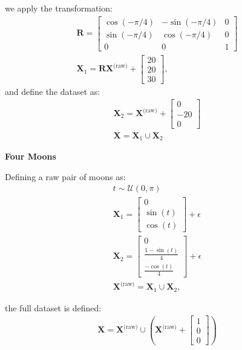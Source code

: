 \documentclass{article} %
\begin{document}
we apply the transformation:
\begin{align}
\mathbf{R} = \begin{bmatrix}
\cos(-\pi/4) & -\sin(-\pi/4) & 0 \\
\sin(-\pi/4) & \cos(-\pi/4) & 0 \\
0 & 0 & 1
\end{bmatrix} \\
\mathbf{X}_1 = \mathbf{R} \mathbf{X}^{\text{(raw)}} + \begin{bmatrix} 20 \\ 20 \\ 30 \end{bmatrix},
\end{align}
and define the dataset as:
\begin{align}
    \mathbf{X}_2 = \mathbf{X}^{\text{(raw)}} + \begin{bmatrix} 0 \\ -20 \\ 0 \end{bmatrix} \\
    \mathbf{X} = \mathbf{X}_1 \cup \mathbf{X}_2
\end{align}

\textbf{Four Moons}

Defining a raw pair of moons as:
\begin{align}
    t \sim \mathcal{U}(0, \pi) \\
\mathbf{X}_1 = \begin{bmatrix}
0 \\
\sin(t) \\
\cos(t)
\end{bmatrix} + \epsilon\\
\mathbf{X}_2 = \begin{bmatrix}
0 \\
\frac{1-\sin(t)}{4} \\
\frac{-\cos(t)}{4}
\end{bmatrix} + \epsilon\\
    \mathbf{X}^{\text{(raw)}} = \mathbf{X}_1 \cup \mathbf{X}_2,
\end{align}

the full dataset is defined:
\begin{align}
    \mathbf{X} = \mathbf{X}^{\text{(raw)}} \cup \left( \mathbf{X}^{\text{(raw)}} + \begin{bmatrix} 1 \\ 0 \\ 0 \end{bmatrix}\right)
\end{align}
\end{document}
